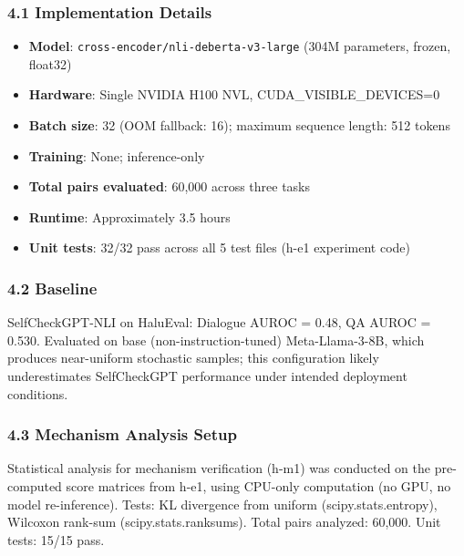 
\subsubsection{4.1 Implementation Details}

\begin{itemize}
\item \textbf{Model}: \texttt{cross-encoder/nli-deberta-v3-large} (304M parameters, frozen, float32)
\item \textbf{Hardware}: Single NVIDIA H100 NVL, CUDA\_VISIBLE\_DEVICES=0
\item \textbf{Batch size}: 32 (OOM fallback: 16); maximum sequence length: 512 tokens
\item \textbf{Training}: None; inference-only
\item \textbf{Total pairs evaluated}: 60,000 across three tasks
\item \textbf{Runtime}: Approximately 3.5 hours
\item \textbf{Unit tests}: 32/32 pass across all 5 test files (h-e1 experiment code)
\end{itemize}

\subsubsection{4.2 Baseline}

SelfCheckGPT-NLI \citep{Manakul2023SelfCheckGPT} on HaluEval: Dialogue AUROC = 0.48, QA AUROC = 0.530. Evaluated on base (non-instruction-tuned) Meta-Llama-3-8B, which produces near-uniform stochastic samples; this configuration likely underestimates SelfCheckGPT performance under intended deployment conditions.

\subsubsection{4.3 Mechanism Analysis Setup}

Statistical analysis for mechanism verification (h-m1) was conducted on the pre-computed score matrices from h-e1, using CPU-only computation (no GPU, no model re-inference). Tests: KL divergence from uniform (scipy.stats.entropy), Wilcoxon rank-sum (scipy.stats.ranksums). Total pairs analyzed: 60,000. Unit tests: 15/15 pass.
